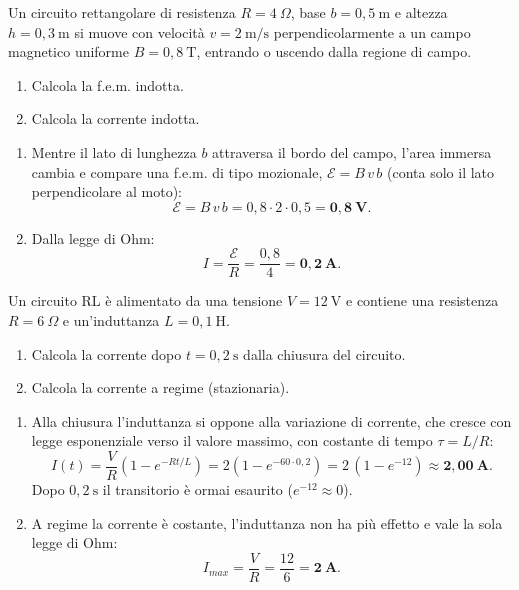 \begin{question}[ID=1.5, subtitle={Circuito rettangolare in moto in campo uniforme}, tags={induzione magnetica, moto}, difficulty=media]
Un circuito rettangolare di resistenza $R = 4\ \Omega$, base $b = 0{,}5\ \text{m}$ e altezza $h = 0{,}3\ \text{m}$ si muove con velocità $v = 2\ \text{m/s}$ perpendicolarmente a un campo magnetico uniforme $B = 0{,}8\ \text{T}$, entrando o uscendo dalla regione di campo.
\begin{enumerate}
    \item Calcola la f.e.m. indotta.
    \item Calcola la corrente indotta.
\end{enumerate}
\begin{solution}
    \begin{enumerate}
        \item Mentre il lato di lunghezza $b$ attraversa il bordo del campo, l'area immersa cambia e compare una f.e.m. di tipo mozionale, $\mathcal{E} = B\,v\,b$ (conta solo il lato perpendicolare al moto):
        \[
        \mathcal{E} = B\,v\,b = 0{,}8\cdot 2\cdot 0{,}5 = \mathbf{0{,}8\ \text{V}}.
        \]
        \item Dalla legge di Ohm:
        \[
        I = \frac{\mathcal{E}}{R} = \frac{0{,}8}{4} = \mathbf{0{,}2\ \text{A}}.
        \]
    \end{enumerate}
\end{solution}
\end{question}

\begin{question}[ID=1.6, subtitle={Circuito RL — corrente transitoria e stazionaria}, tags={induzione magnetica, circuito RL}, difficulty=media]
Un circuito RL è alimentato da una tensione $V = 12\ \text{V}$ e contiene una resistenza $R = 6\ \Omega$ e un'induttanza $L = 0{,}1\ \text{H}$.
\begin{enumerate}
    \item Calcola la corrente dopo $t = 0{,}2\ \text{s}$ dalla chiusura del circuito.
    \item Calcola la corrente a regime (stazionaria).
\end{enumerate}
\begin{solution}
    \begin{enumerate}
        \item Alla chiusura l'induttanza si oppone alla variazione di corrente, che cresce con legge esponenziale verso il valore massimo, con costante di tempo $\tau = L/R$:
        \[
        I(t) = \frac{V}{R}\!\left(1 - e^{-Rt/L}\right) = 2\left(1 - e^{-60\cdot 0{,}2}\right) = 2\,(1 - e^{-12}) \approx \mathbf{2{,}00\ \text{A}}.
        \]
        Dopo $0{,}2\ \text{s}$ il transitorio è ormai esaurito ($e^{-12}\approx 0$).
        \item A regime la corrente è costante, l'induttanza non ha più effetto e vale la sola legge di Ohm:
        \[
        I_{max} = \frac{V}{R} = \frac{12}{6} = \mathbf{2\ \text{A}}.
        \]
    \end{enumerate}
\end{solution}
\end{question}


